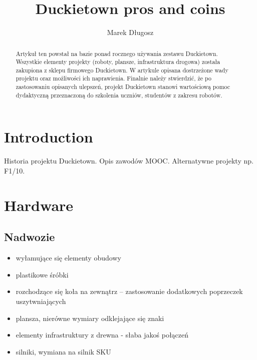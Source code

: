 \documentclass{svproc}
\begin{document}
\mainmatter              %
%
\title{Duckietown pros and coins}
%
%
\author{Marek Długosz}
%
%
%

\maketitle              %

\begin{abstract}
Artykuł ten powstał na bazie ponad rocznego używania zestawu Duckietown. Wszystkie elementy projekty (roboty, plansze, infrastruktura drogowa) została zakupiona z sklepu firmowego Duckietown.
W artykule opisana dostrzeżone wady projektu oraz możliwości ich naprawienia.
Finalnie należy stwierdzić, że po zastosowaniu opisanych ulepszeń, projekt Duckietown stanowi wartościową pomoc dydaktyczną przeznaczoną do szkolenia uczniów, studentów z zakresu robotów.
\end{abstract}
%
\section{Introduction}
Historia projektu Duckietown. Opis zawodów MOOC.
Alternatywne projekty np. F1/10.

\section{Hardware}
\subsection{Nadwozie}
\begin{itemize}
\item wyłamujące się elementy obudowy
\item plastikowe śróbki
\item rozchodzące się koła na zewnątrz -- zastosowanie dodatkowych poprzeczek uszytwniających
\item plansza, nierówne wymiary odklejające się znaki
\item elementy infrastruktury z drewna - słaba jakoś połączeń
\item silniki, wymiana na silnik SKU 
\end{itemize}
\end{document}

